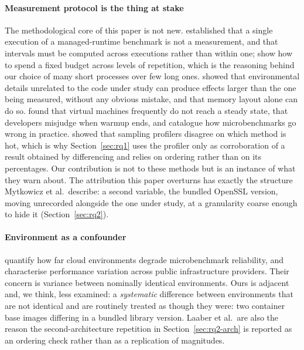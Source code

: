 \documentclass[preprint,12pt,authoryear]{elsarticle}
\begin{document}
\paragraph{Measurement protocol is the thing at stake} The methodological core
of this paper is not new. \citet{georges2007statistically}
established that a single execution of a managed-runtime benchmark is not a
measurement, and that intervals must be computed across executions rather than
within one; \citet{kalibera2013rigorous} show how to spend a
fixed budget across levels of repetition, which is the reasoning behind our
choice of many short processes over few long ones. \citet{mytkowicz2009wrong} showed that environmental details unrelated to
the code under study can produce effects larger than the one being measured,
without any obvious mistake, and \citet{curtsinger2013stabilizer} that memory layout alone can do so.
\citet{barrett2017warmup} found that virtual machines frequently
do not reach a steady state, \citet{traini2023steady} that
developers misjudge when warmup ends, and \citet{costa2021wrong}
catalogue how microbenchmarks go wrong in practice. \citet{mytkowicz2010profilers} showed that sampling profilers disagree on
which method is hot, which is why Section~\ref{sec:rq1} uses the profiler only
as corroboration of a result obtained by differencing and relies on ordering
rather than on its percentages. Our contribution is not to these methods but is
an instance of what they warn about. The attribution this paper overturns has
exactly the structure Mytkowicz et al.\ describe: a second variable, the
bundled OpenSSL version, moving unrecorded alongside the one under study, at
a granularity coarse enough to hide it (Section~\ref{sec:rq2}).

\paragraph{Environment as a confounder} \citet{laaber2019cloud}
quantify how far cloud environments degrade microbenchmark reliability, and
\citet{leitner2016patterns} characterise performance variation
across public infrastructure providers. Their concern is variance between
nominally identical environments. Ours is adjacent and, we think, less
examined: a \emph{systematic} difference between environments that are not
identical and are routinely treated as though they were: two container base
images differing in a bundled library version. Laaber et al.\ are also the
reason the second-architecture repetition in Section~\ref{sec:rq2-arch} is
reported as an ordering check rather than as a replication of magnitudes.
\end{document}
